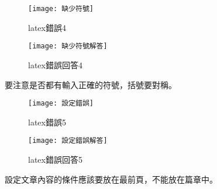 \begin{figure}[ht]
  \begin{minipage}{0.5\textwidth}
    \centering
    \texttt{[image: 缺少符號]}
    \caption{latex錯誤4}
  \end{minipage}%
  \begin{minipage}{0.5\textwidth}
    \centering
    \texttt{[image: 缺少符號解答]}
    \caption{latex錯誤回答4}
  \end{minipage}
\end{figure}

要注意是否都有輸入正確的符號，括號要對稱。\\

\begin{figure}[ht]
  \begin{minipage}{0.5\textwidth}
    \centering
    \texttt{[image: 設定錯誤]}
    \caption{latex錯誤5}
  \end{minipage}%
  \begin{minipage}{0.5\textwidth}
    \centering
    \texttt{[image: 設定錯誤解答]}
    \caption{latex錯誤回答5}
  \end{minipage}
\end{figure}

設定文章內容的條件應該要放在最前頁，不能放在篇章中。
\newpage
